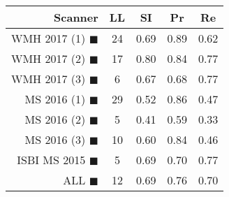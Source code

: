 \begin{tabular}{rcccc}
\toprule
Scanner & LL & SI & Pr & Re \\
\midrule
WMH 2017 (1) {\color[rgb]{ 1.00 0.00 0.00}$\blacksquare$} & 24 & 0.69 & 0.89 & 0.62 \\
WMH 2017 (2) {\color[rgb]{ 1.00 0.50 0.00}$\blacksquare$} & 17 & 0.80 & 0.84 & 0.77 \\
WMH 2017 (3) {\color[rgb]{ 1.00 0.80 0.00}$\blacksquare$} & 6 & 0.67 & 0.68 & 0.77 \\
MS  2016 (1) {\color[rgb]{ 0.20 0.80 0.00}$\blacksquare$} & 29 & 0.52 & 0.86 & 0.47 \\
MS  2016 (2) {\color[rgb]{ 0.00 0.40 1.00}$\blacksquare$} & 5 & 0.41 & 0.59 & 0.33 \\
MS  2016 (3) {\color[rgb]{ 0.60 0.00 1.00}$\blacksquare$} & 10 & 0.60 & 0.84 & 0.46 \\
ISBI MS 2015 {\color[rgb]{ 1.00 0.00 1.00}$\blacksquare$} & 5 & 0.69 & 0.70 & 0.77 \\
\midrule
ALL {\color[rgb]{ 1.00 1.00 1.00}$\blacksquare$} & 12 & 0.69 & 0.76 & 0.70 \\
\bottomrule
\end{tabular}